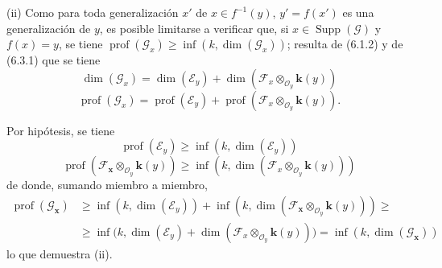 
(ii) Como para toda generalización $x'$ de $x\in f^{-1}(y)$,
$y'=f(x')$ es una generalización de $y$, es posible limitarse a verificar que,
si $x\in\operatorname{Supp}(\mathscr G)$ y $f(x)=y$, se tiene
$\operatorname{prof}(\mathscr G_x)\geq\inf(k,\dim(\mathscr G_x))$; resulta de
(6.1.2) y de (6.3.1) que se tiene
\[
\dim(\mathscr G_x)=\dim(\mathscr E_y)+
\dim(\mathscr F_x\otimes_{\mathcal O_y}\boldsymbol{k}(y))
\]
\[
\operatorname{prof}(\mathscr G_x)=\operatorname{prof}(\mathscr E_y)+
\operatorname{prof}(\mathscr F_x\otimes_{\mathcal O_y}\boldsymbol{k}(y)).
\]

Por hipótesis, se tiene
\[
\operatorname{prof}(\mathscr E_y)\geq\inf(k,\dim(\mathscr E_y))
\]
\[
\operatorname{prof}(\mathscr F_{\boldsymbol{x}}\otimes_{\mathcal O_y}\boldsymbol{k}(y))
\geq\inf(k,\dim(\mathscr F_x\otimes_{\mathcal O_y}\boldsymbol{k}(y)))
\]
de donde, sumando miembro a miembro,
\begin{align*}
\operatorname{prof}(\mathscr G_{\boldsymbol{x}})
&\geq\inf(k,\dim(\mathscr E_y))
+\inf(k,\dim(\mathscr F_{\boldsymbol{x}}\otimes_{\mathcal O_y}\boldsymbol{k}(y)))\geq{}\\
&\geq\inf\bigl(k,\dim(\mathscr E_y)
+\dim(\mathscr F_x\otimes_{\mathcal O_y}\boldsymbol{k}(y))\bigr)
=\inf(k,\dim(\mathscr G_{\boldsymbol{x}}))
\end{align*}
lo que demuestra (ii).
